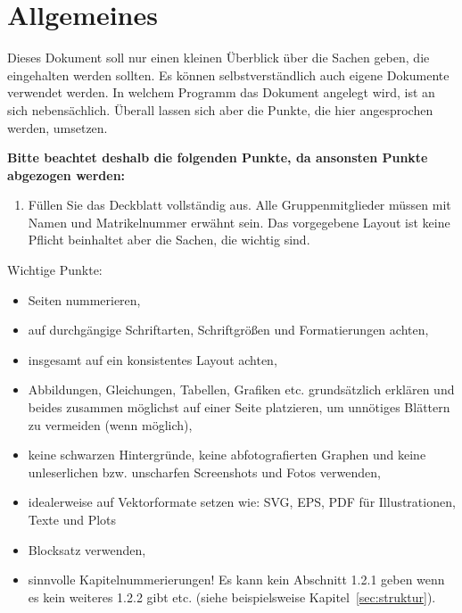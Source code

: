 \documentclass[a4paper, 12pt]{article}
\begin{document}
\newcommand\labgroup{A1}
\newcommand\firstauthorname{Vorname1 Nachname1}
\newcommand\firstauthormatnr{000000}
\newcommand\secondauthorname{Maximilian Steinbauer}
\newcommand\secondauthormatnr{102773}


\newpage

\tableofcontents
\newpage

\section{Allgemeines}
Dieses Dokument soll nur einen kleinen Überblick über die Sachen geben, die eingehalten werden sollten. Es können selbstverständlich auch eigene Dokumente verwendet werden. In welchem Programm das Dokument angelegt wird, ist an sich nebensächlich. Überall lassen sich aber die Punkte, die hier angesprochen werden, umsetzen.

\textbf{Bitte beachtet deshalb die folgenden Punkte, da ansonsten Punkte abgezogen werden:}
\begin{enumerate}
    \item Füllen Sie das Deckblatt vollständig aus. Alle Gruppenmitglieder müssen mit Namen und Matrikelnummer erwähnt sein. Das vorgegebene Layout ist keine Pflicht beinhaltet aber die Sachen, die wichtig sind.
\end{enumerate}

Wichtige Punkte:
\begin{itemize}
    \item Seiten nummerieren,
    \item auf durchgängige Schriftarten, Schriftgrößen und Formatierungen achten,
    \item insgesamt auf ein konsistentes Layout achten,
    \item Abbildungen, Gleichungen, Tabellen, Grafiken etc. grundsätzlich erklären und beides zusammen möglichst auf einer Seite platzieren, um unnötiges Blättern zu vermeiden (wenn möglich),
    \item keine schwarzen Hintergründe, keine abfotografierten Graphen und keine unleserlichen bzw. unscharfen Screenshots und Fotos verwenden,
    \item idealerweise auf Vektorformate setzen wie: SVG, EPS, PDF für Illustrationen, Texte und Plots
    \item Blocksatz verwenden,
    \item sinnvolle Kapitelnummerierungen! Es kann kein Abschnitt 1.2.1 geben wenn es kein weiteres 1.2.2 gibt etc. (siehe beispielsweise Kapitel~\ref{sec:struktur}).
\end{itemize}
\end{document}

